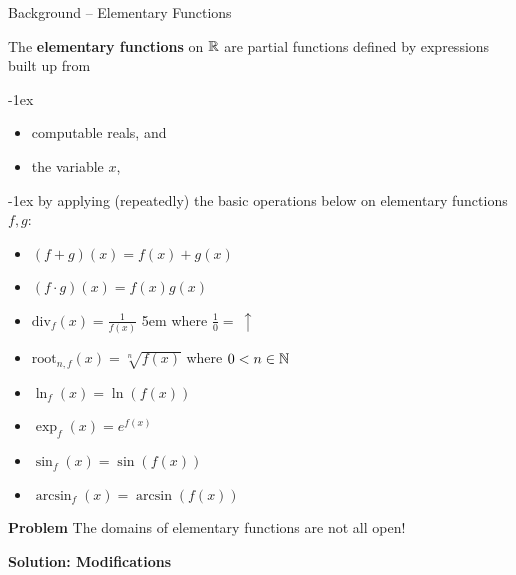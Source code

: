 \begin{frame}{Background -- Elementary Functions}
    \pause \vspace{-2em}
    \begin{minipage}[t]{0.48\linewidth}
        \begin{definition}
            The \textbf{elementary functions} on $\mathbb{R}$  are partial functions deﬁned by expressions built up from 
            \pause

            \kern-1ex
            \begin{itemize}
                \setlength\itemsep{-1pt}
                \item computable reals, and
                \item the variable $x$,
            \end{itemize}
            \kern-1ex
            \pause by applying (repeatedly) the basic operations below on elementary functions $f,g$:
            \pause
            \begin{itemize}
                \setlength\itemsep{-1pt}
                \item $(f+g)(x) = f(x) + g(x)$ 
                \item $(f\cdot g)(x) = f(x)g(x)$
                \item $\mathrm{div}_f(x) = \frac{1}{f(x)}$ \kern5em where $\frac{1}{0} =\ \uparrow$
                \item $\mathrm{root}_{n,f}(x) = \sqrt[n]{f(x)}$ \hfill where $0< n \in \mathbb{N}$
                \item $\ln_f(x) = \ln(f(x))$
                \item $\exp_f(x) = e^{f(x)}$
                \item $\sin_f(x) = \sin(f(x))$
                \item $\arcsin_f(x) = \arcsin(f(x))$
            \end{itemize}
        \end{definition}
    \end{minipage}
    \hfill
    \pause \begin{minipage}[t]{0.45\linewidth}
        \begin{exampleblock}{\textbf{\textcolor{BrickRed}{Problem}}}
            The domains of elementary functions are not all open!
        \end{exampleblock}
        \pause
        \begin{exampleblock}{\textbf{Solution: Modifications}}

\end{exampleblock}
\end{minipage}
\end{frame}
